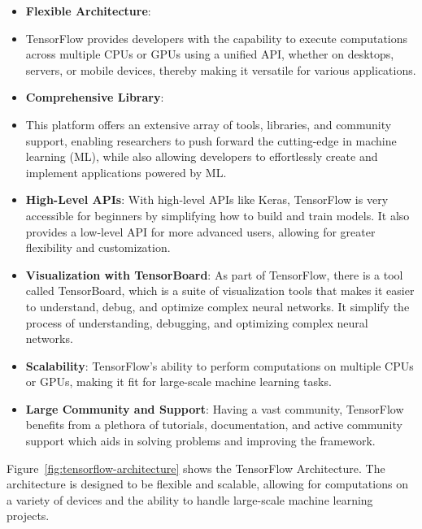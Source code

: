 \begin{itemize}
    \item \textbf{Flexible Architecture}: 
    \item 
    TensorFlow provides developers with the capability to execute computations across multiple CPUs or GPUs using a unified API, whether on desktops, servers, or mobile devices, thereby making it versatile for various applications.
    \item \textbf{Comprehensive Library}: 
    \item This platform offers an extensive array of tools, libraries, and community support, enabling researchers to push forward the cutting-edge in machine learning (ML), while also allowing developers to effortlessly create and implement applications powered by ML.
    \item \textbf{High-Level APIs}: With high-level APIs like Keras, TensorFlow is very accessible for beginners by simplifying how to build and train models. It also provides a low-level API for more advanced users, allowing for greater flexibility and customization.
    \item \textbf{Visualization with TensorBoard}: As part of TensorFlow, there is a tool called TensorBoard, which is a suite of visualization tools that makes it easier to understand, debug, 
    and optimize complex neural networks. It simplify the process of understanding, debugging, and optimizing complex neural networks.
    \item \textbf{Scalability}: TensorFlow's ability to perform computations on multiple CPUs or GPUs, making it fit for large-scale machine learning tasks.
    \item \textbf{Large Community and Support}: Having a vast community, TensorFlow benefits from a plethora of tutorials, documentation, and active community support which aids in solving problems and improving the framework.
\end{itemize}

Figure~\ref{fig:tensorflow-architecture} \cite{tensorflow_arch} shows the TensorFlow Architecture. The architecture is designed to be flexible and scalable, allowing for computations on a variety of devices and the ability to handle large-scale machine learning projects.

